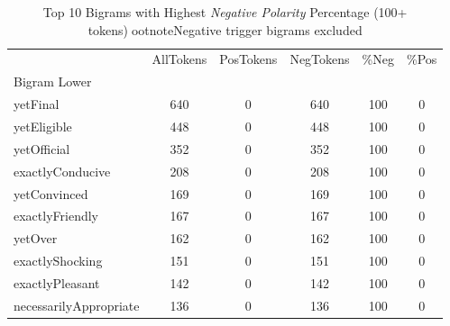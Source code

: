 

\singlespacing
\scriptsize\noindent
\begin{table}
\centering
\caption{Top 10 Bigrams with Highest \textit{Negative Polarity} Percentage (100+ tokens)ootnote{Negative trigger bigrams excluded}}
\label{tab:top10NegPercent}
\begin{tabular}{*{1}{l}S[table-auto-round, table-format=7.2, drop-zero-decimal]
    S[table-auto-round, table-format=7.2, drop-zero-decimal]
    S[table-auto-round, table-format=7.2, drop-zero-decimal]
    S[table-auto-round, table-format=7.2, drop-zero-decimal]
    S[table-auto-round, table-format=7.2, drop-zero-decimal]}
\toprule
{} & {AllTokens} & {PosTokens} & {NegTokens} & {\%Neg} & {\%Pos} \\
{Bigram Lower} & {} & {} & {} & {} & {} \\
\midrule
yetFinal & 640 & 0 & 640 & 100 & 0 \\
yetEligible & 448 & 0 & 448 & 100 & 0 \\
yetOfficial & 352 & 0 & 352 & 100 & 0 \\
exactlyConducive & 208 & 0 & 208 & 100 & 0 \\
yetConvinced & 169 & 0 & 169 & 100 & 0 \\
exactlyFriendly & 167 & 0 & 167 & 100 & 0 \\
yetOver & 162 & 0 & 162 & 100 & 0 \\
exactlyShocking & 151 & 0 & 151 & 100 & 0 \\
exactlyPleasant & 142 & 0 & 142 & 100 & 0 \\
necessarilyAppropriate & 136 & 0 & 136 & 100 & 0 \\
\bottomrule
\end{tabular}
\end{table}

\normalsize
\normalspacing
